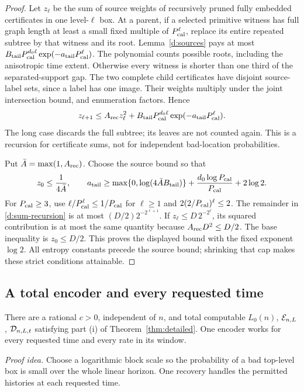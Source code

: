 \begin{proof}
Let \(z_\ell\) be the sum of source weights of recursively pruned
fully embedded certificates in one level-\(\ell\) box. At a parent,
if a selected primitive witness has full graph length at least a
small fixed multiple of \(P_{\rm cal}^{\ell}\), replace its entire
repeated subtree by that witness and its root. Lemma~\ref{d:sources}
pays at most
\(B_{\rm tail}P_{\rm cal}^{d_0\ell}
 \exp(-a_{\rm tail}P_{\rm cal}^{\ell})\).
The polynomial counts possible roots, including the anisotropic time
extent. Otherwise every witness is shorter than one third of the
separated-support gap. The two complete child certificates have
disjoint source-label sets, since a label has one image. Their
weights multiply under the joint intersection bound, and enumeration
factors. Hence
\begin{equation}\label{d:sum-recursion}
 z_{\ell+1}\le A_{\rm rec}z_\ell^2+
 B_{\rm tail}P_{\rm cal}^{d_0\ell}\exp(-a_{\rm tail}P_{\rm cal}^{\ell}).
\end{equation}
The long case discards the full subtree; its leaves are not counted
again. This is a recursion for certificate sums, not for independent
bad-location probabilities.

Put \(\bar A=\max(1,A_{\rm rec})\). Choose the source bound so that
\[
 z_0\le\frac1{4\bar A},\qquad
 a_{\rm tail}\ge\max\{0,\log(4\bar A B_{\rm tail})\}
       +\frac{d_0\log P_{\rm cal}}{P_{\rm cal}}+2\log2.
\]
For \(P_{\rm cal}\ge3\), use
\(\ell/P_{\rm cal}^{\ell}\le1/P_{\rm cal}\) for \(\ell\ge1\)
and \(2(2/P_{\rm cal})^\ell\le2\).
The remainder in \eqref{d:sum-recursion} is at most
\((D/2)2^{-2^{\ell+1}}\). If \(z_\ell\le D\,2^{-2^\ell}\), its
squared contribution is at most the same quantity because
\(A_{\rm rec}D^2\le D/2\). The base inequality is
\(z_0\le D/2\). This proves the displayed bound with the fixed
exponent \(\log2\). All entropy constants precede the source bound;
shrinking that cap makes these strict conditions attainable.
\end{proof}

\subsection{A total encoder and every requested time}

\begin{proposition}\label{d:storage}
There are a rational \(c>0\), independent of \(n\), and total
computable \(L_0(n)\), \(\mathcal E_{n,L}\), \(\mathcal D_{n,L,t}\) satisfying
part (i) of Theorem~\ref{thm:detailed}. One encoder works for every
requested time and every rate in its window.
\end{proposition}
\par\noindent\emph{Proof idea.} Choose a logarithmic block scale so the probability of a bad top-level box is small over the whole linear horizon. One recovery handles the permitted histories at each requested time.

